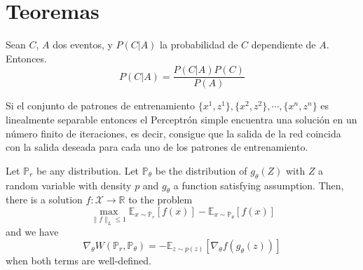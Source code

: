 \chapter*{Teoremas}


\begin{theorem}[Bayes]
    \label{theorem:bayes}
    Sean $C$, $A$ dos eventos, y $P(C|A)$ la probabilidad de $C$ dependiente de $A$. Entonces.
    \[ P(C|A) = \frac{P(C|A) P(C)}{P(A)} \]
\end{theorem}


\begin{theorem}
    \label{theorem:ConvergenciaRosenblatt}
    Si el conjunto de patrones de entrenamiento $ \{x^{1}, z^{1}\}, \{x^{2}, z^{2}\}, \cdots, \{x^{n}, z^{n}\} $ es linealmente separable entonces el Perceptrón simple encuentra una solución en un número finito de iteraciones, es decir, consigue que la salida de la red coincida con la salida deseada para cada uno de los patrones de entrenamiento.
\end{theorem}


\begin{theorem}[Wasserstein]
    \label{theorem::gradW}
    Let $\mathbb{P}_r$ be any distribution. Let $\mathbb{P}_\theta$ be the distribution of $g_\theta(Z)$ with $Z$ a random variable with density $p$ and $g_\theta$ a function satisfying assumption.
    Then, there is a solution $f: \mathcal{X} \rightarrow \mathbb{R}$
    to the problem
    $$ \max_{\|f\|_L \leq 1} \mathbb{E}_{x \sim \mathbb{P}_r}[f(x)] - \mathbb{E}_{x \sim \mathbb{P}_\theta} [f(x)] $$
    and we have
    $$ \nabla_\theta W(\mathbb{P}_r, \mathbb{P}_\theta) = -\mathbb{E}_{z \sim p(z)}[\nabla_\theta f(g_\theta(z))] $$
    when both terms are well-defined.
\end{theorem}
